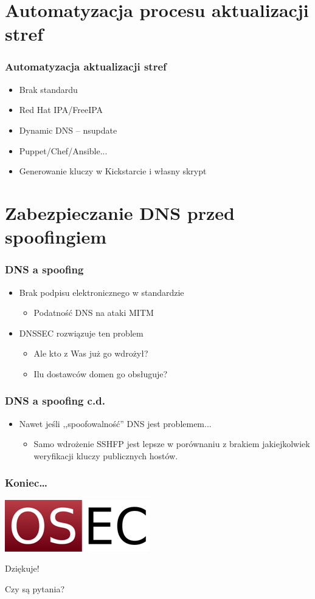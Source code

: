 \documentclass[dvipsnames,table]{beamer}
\begin{document}
\section{Automatyzacja procesu aktualizacji stref}

\begin{frame}
\frametitle{Automatyzacja aktualizacji stref}
\begin{itemize}
	\item Brak standardu \Sadey
	\item Red Hat IPA/FreeIPA
	\item Dynamic DNS -- nsupdate
	\item Puppet/Chef/Ansible...
	\item Generowanie kluczy w Kickstarcie i własny skrypt
\end{itemize}
\end{frame}

\section{Zabezpieczanie DNS przed spoofingiem}

\begin{frame}
\frametitle{DNS a spoofing}
\begin{itemize}
	\item Brak podpisu elektronicznego w standardzie \Sadey
	\begin{itemize}
		\item Podatność DNS na ataki MITM
	\end{itemize}
	\item DNSSEC rozwiązuje ten problem
	\begin{itemize}
		\item Ale kto z Was już go wdrożył?
		\item Ilu dostawców domen go obsługuje?
	\end{itemize}
\end{itemize}
\end{frame}

\begin{frame}
\frametitle{DNS a spoofing c.d.}
\begin{itemize}
	\item Nawet jeśli ,,spoofowalność'' DNS jest problemem...
	\begin{itemize}
		\item Samo wdrożenie SSHFP jest lepsze w porównaniu z brakiem jakiejkolwiek weryfikacji kluczy publicznych hostów.
	\end{itemize}

\end{itemize}
\end{frame}

\begin{frame}
\frametitle{Koniec\ldots}
\begin{center}
\includegraphics[scale=0.5]{img-oseclogo.png}

Dziękuje!

Czy są pytania?

\end{center}

\end{frame}

 
\end{document}

